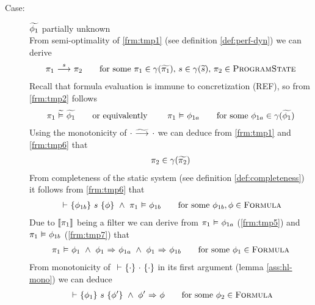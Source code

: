 \begin{proofatend}
\begin{description}
        \item[Case:] $\widetilde{\phi_1}$ partially unknown~\\
        From semi-optimality of \ref{frm:tmp1} (see definition \ref{def:perf-dyn}) we can derive
        \begin{align}
        \label{frm:tmp6}
        \sstepConsume{s}{\pi_1}{\pi_2}
        \quad\quad\text{for some } \pi_1 \in \gamma(\grad{\pi_1}),\, s \in \gamma(\grad{s}),\, \pi_2 \in \setProgramState
        \end{align}
        Recall that formula evaluation is immune to concretization (REF), so from \ref{frm:tmp2} follows
        \begin{align}
        \label{frm:tmp5}
        \evalgphiGen{\pi_1}{\grad{\phi_1}}
        \text{\quad\quad or equivalently \quad\quad}
        \evalphiGen{\pi_1}{\phi_{1a}}
        \quad\quad\text{for some } \phi_{1a} \in \gamma(\grad{\phi_1}) 
        \end{align}
        Using the monotonicity of ${\cdot} \,\,{\widetilde{\longrightarrow}^{}}\,\, {\cdot}$ we can deduce from \ref{frm:tmp1} and \ref{frm:tmp6} that
        \begin{align}
        \label{frm:tmp6x}
        \pi_2 \in \gamma(\grad{\pi_2})
        \end{align}
        From completeness of the static system (see definition \ref{def:completeness}) it follows from \ref{frm:tmp6} that
        \begin{align}
        \label{frm:tmp7}
        \thoare{}{\phi_{1b}}{s}{\phi} ~\wedge~ \evalphiGen{\pi_1}{\phi_{1b}}
        \quad\quad\text{for some } \phi_{1b}, \phi \in \setFormula
        \end{align}
        Due to $\llbracket {\pi_1} \rrbracket$ being a filter we can derive from $\pi_1 \,\,{\vDash}\,\, \phi_{1a}$ (\ref{frm:tmp5}) and $\pi_1 \,\,{\vDash}\,\, \phi_{1b}$ (\ref{frm:tmp7}) that
        \begin{align}
        \label{frm:tmp8}
        \evalphiGen{\pi_1}{\phi_1} ~\wedge~ \phiImplies{\phi_1}{\phi_{1a}} ~\wedge~ \phiImplies{\phi_1}{\phi_{1b}}
        \quad\quad\text{for some } \phi_1 \in \setFormula
        \end{align}
        From monotonicity of ${} \,\,{\vdash}\,\, \{{\cdot}\} ~{\cdot}~ \{{\cdot}\}$ in its first argument (lemma \ref{ass:hl-mono}) we can deduce
        \begin{align}
        \label{frm:tmp9}
        \thoare{}{\phi_1}{s}{\phi'} ~\wedge~ \phiImplies{\phi'}{\phi}
        \quad\quad\text{for some } \phi_2 \in \setFormula
        \end{align}

\end{description}
\end{proofatend}
